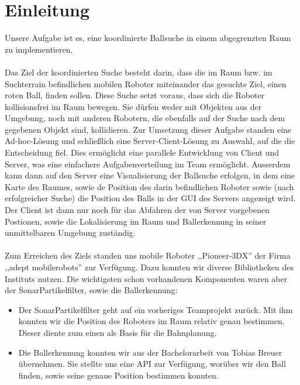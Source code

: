 
    \chapter{Einleitung}
    \label{einleitung}
    Unsere Aufgabe ist es, eine koordinierte Ballsuche in einem abgegrenzten Raum
    zu implementieren. \\\\

Das Ziel der koordinierten Suche besteht darin, dass die im Raum bzw. im
Suchterrain befindlichen mobilen Roboter miteinander das gesuchte Ziel, einen roten Ball,
finden sollen. Diese Suche setzt voraus, dass sich die Roboter kollisionsfrei
im Raum bewegen. Sie dürfen weder mit Objekten aus der Umgebung, noch
mit anderen Robotern, die ebenfalls auf der Suche nach dem gegebenen
Objekt sind, kollidieren. Zur Umsetzung dieser Aufgabe standen eine
Ad-hoc-Lösung und schließlich eine Server-Client-Lösung zu Auswahl, auf
die die Entscheidung fiel. Dies ermöglicht eine parallele Entwicklung
von Client und Server, was eine einfachere Aufgabenverteilung im Team
ermöglicht. Ausserdem kann dann auf den Server eine Visualisierung der
Ballsuche erfolgen, in dem eine Karte des Raumes, sowie de Position des darin
befindlichen Roboter sowie (nach erfolgreicher Suche) die Position des Balls in der
GUI des Servers angezeigt wird. Der Client ist dann nur noch für das
Abfahren der von Server vorgebenen Postionen, sowie die Lokalisierung
im Raum und Ballerkennung in seiner unmittelbaren Umgebung
zuständig. \\\\
Zum Erreichen des Ziels standen uns mobile Roboter 
    ,,Pioneer-3DX'' der Firma ,,adept mobilerobots'' zur
    Verfügung. Dazu konnten wir diverse Bibliotheken des Instituts
    nutzen. Die wichtigsten schon vorhandenen Komponenten waren aber
    der SonarPartikelfilter, sowie die Ballerkennung:
    \begin{itemize}
    \item Der SonarPartikelfilter geht auf ein vorheriges Teamprojekt
      zurück. Mit ihm konnten wir die Position des Roboters im Raum
      relativ  genau bestimmen. Dieser diente zum einen als
      Basis für die Bahnplanung.
    \item Die Ballerkennung konnten wir aus der Bachelorarbeit von
      Tobias Breuer übernehmen. Sie stellte uns eine API zur Verfügung,
      worüber wir den Ball finden, sowie seine genaue Position
      bestimmen konnten.
    \end{itemize}
